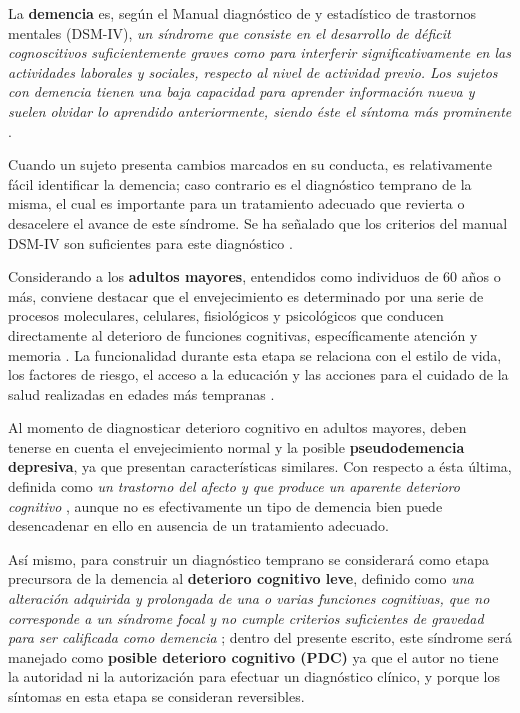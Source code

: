 La \textbf{demencia} es, según el Manual diagnóstico de y estadístico de trastornos mentales 
(DSM-IV), \textit{un síndrome que consiste en el desarrollo de déficit cognoscitivos 
suficientemente graves como para interferir significativamente en las actividades laborales y 
sociales, respecto al nivel de actividad previo. 
Los sujetos con demencia tienen una baja capacidad para aprender información nueva y suelen olvidar 
lo aprendido anteriormente, siendo éste el síntoma más prominente} \cite{DCM5}.

Cuando un sujeto presenta cambios marcados en su conducta, es relativamente fácil identificar la 
demencia; caso contrario es el diagnóstico temprano de la misma, el cual es importante para un 
tratamiento adecuado que revierta o desacelere el avance de este síndrome.
Se ha señalado que los criterios del manual DSM-IV son suficientes para este diagnóstico
\cite{Knopman01}.

Considerando a los \textbf{adultos mayores}, entendidos como individuos de 60 años o más, conviene 
destacar que el envejecimiento es determinado por una serie de procesos moleculares, celulares, 
fisiológicos y psicológicos que conducen directamente al deterioro de funciones cognitivas, 
específicamente atención y memoria \cite{Navarrete03,Park09}.
La funcionalidad durante esta etapa se relaciona con el estilo de vida, los factores de riesgo, el 
acceso a la educación y las acciones para el cuidado de la salud realizadas en edades más 
tempranas \cite{Ohayon04,Sanhueza14}.

Al momento de diagnosticar deterioro cognitivo en adultos mayores, deben tenerse en cuenta el 
envejecimiento normal y la posible \textbf{pseudodemencia depresiva}, ya que presentan 
características similares. Con respecto a ésta última, definida como \textit{un trastorno del 
afecto y que produce un aparente deterioro cognitivo} \cite{DCM5}, aunque no es efectivamente un 
tipo de demencia bien puede desencadenar en ello en ausencia de un tratamiento adecuado.

Así mismo, para construir un diagnóstico temprano
se considerará como etapa precursora de la demencia al \textbf{deterioro cognitivo 
leve}, definido como \textit{una alteración adquirida y prolongada de 
una o varias funciones cognitivas, que no corresponde a un síndrome focal y no cumple criterios 
suficientes de gravedad para ser calificada como demencia} \cite{Robles02};
dentro del presente escrito, este síndrome será manejado como \textbf{posible deterioro 
cognitivo (PDC)} ya que el autor no tiene la autoridad ni la autorización para efectuar un 
diagnóstico clínico, y porque los síntomas en esta etapa se consideran %
reversibles.

